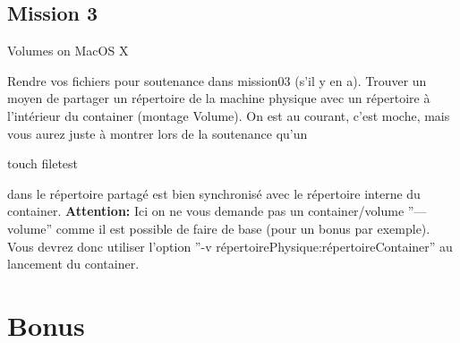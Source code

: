 \documentclass{42}
\begin{document}
	\newpage

\section{Mission 3}
\begin{center}
	{\Huge Volumes on MacOS X}
\end{center}

Rendre vos fichiers pour soutenance dans mission03 (s’il y en a).
\newline
\newline
Trouver un moyen de partager un répertoire de la machine physique avec un répertoire à l'intérieur du container (montage Volume).
On est au courant, c’est moche, mais vous aurez juste à montrer lors de la soutenance qu’un
\begin{42console}
touch filetest
\end{42console}
dans le répertoire partagé est bien synchronisé avec le répertoire interne du container.
\newline
\newline
\newline
\warn
{
\textbf{Attention:}
\newline
\newline
Ici on ne vous demande pas un container/volume ''---volume'' comme il est possible de faire de base (pour un bonus par exemple).
\newline
\newline
Vous devrez donc utiliser l’option
\newline
''-v répertoirePhysique:répertoireContainer'' au lancement du container.
}

\chapter{Bonus}
\end{document}
